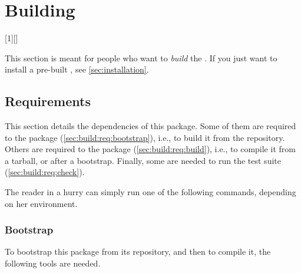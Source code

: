 
\chapter{Building \usdk}
\label{sec:build}

[1][]
  {%
    }
  {\cxxPost}

This section is meant for people who want to \emph{build} the \usdk.  If
you just want to install a pre-built \usdk, see \autoref{sec:installation}.

\section{Requirements}
\label{sec:build:req}

This section details the dependencies of this package.  Some of them are
required to  the package (\autoref{sec:build:req:bootstrap}),
i.e., to build it from the repository.  Others are required to 
the package (\autoref{sec:build:req:build}), i.e., to compile it from a
tarball, or after a bootstrap.  Finally, some are needed to run the test
suite (\autoref{sec:build:req:check}).

The reader in a hurry can simply run one of the following commands,
depending on her environment.



\subsection{Bootstrap}
\label{sec:build:req:bootstrap}

To bootstrap this package from its repository, and then to compile it,
the following tools are needed.

